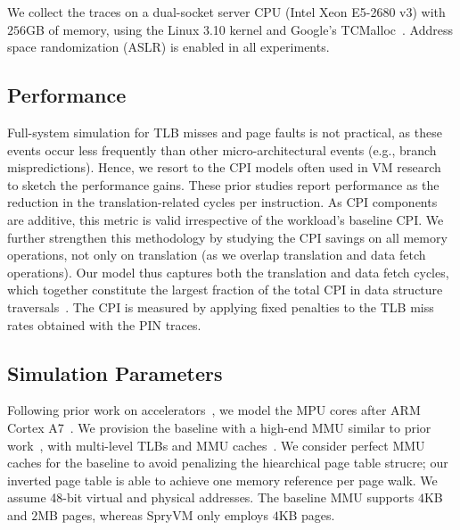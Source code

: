 We collect the traces on a dual-socket server CPU (Intel Xeon E5-2680 v3) with $256$GB of memory, using the Linux 3.10 kernel and Google's TCMalloc~\cite{google:tcmalloc}. Address space randomization (ASLR) is enabled in all experiments.

\subsection{Performance}


Full-system simulation for TLB misses and page faults is not practical, as these events occur less frequently than other micro-architectural events (e.g., branch mispredictions). Hence, we resort to the CPI models often used in VM research~\cite{papadopoulou:prediction-based, saulsbury:recently-based, bhattacharjee:shared} to sketch the performance gains. These prior studies report performance as the reduction in the translation-related cycles per instruction. As CPI components are additive, this metric is valid irrespective of the workload's baseline CPI. We further strengthen this methodology by studying the CPI savings on all memory operations, not only on translation (as we overlap translation and data fetch operations). Our model thus captures both the translation and data fetch cycles, which together constitute the largest fraction of the total CPI in data structure traversals~\cite{picorel:near-memory}. The CPI is measured by applying fixed penalties to the TLB miss rates obtained with the PIN traces.

\subsection{Simulation Parameters}
Following prior work on accelerators~\cite{gao:practical, ahn:scalable, pugsley:ndc}, we model the MPU cores after ARM Cortex A7~\cite{arm:cortex-a7}. We provision the baseline with a high-end MMU similar to prior work~\cite{haria:devirtualizing}, with multi-level TLBs and MMU caches~\cite{bhattacharjee:large-reach, barr:translation}. We consider perfect MMU caches for the baseline to avoid penalizing the hiearchical page table strucre; our inverted page table is able to achieve one memory reference per page walk. We assume 48-bit virtual and physical addresses. The baseline MMU supports $4$KB and $2$MB pages, whereas SpryVM only employs $4$KB pages. 

